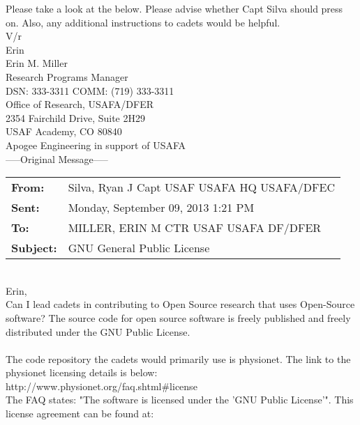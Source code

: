 \documentclass{article}
\begin{document}
Please take a look at the below. Please advise whether Capt Silva should press on. Also, any additional instructions to cadets would be helpful. \\

V/r \\

Erin \\

\noindent Erin M. Miller \\
Research Programs Manager \\
DSN: 333-3311 COMM: (719) 333-3311 \\
Office of Research, USAFA/DFER \\
2354 Fairchild Drive, Suite 2H29 \\
USAF Academy, CO 80840 \\
Apogee Engineering in support of USAFA \\
\newpage
\noindent-----Original Message----- \\

\noindent \begin{tabu} to \textwidth{l X[l]}
 
  \textbf{From:} & Silva, Ryan J Capt USAF USAFA HQ USAFA/DFEC  \\
  \textbf{Sent:} & Monday, September 09, 2013 1:21 PM \\
  \textbf{To:} & MILLER, ERIN M CTR USAF USAFA DF/DFER \\
  \textbf{Subject:} & GNU General Public License \\
\end{tabu}
\hspace{0pt} \\

Erin, \\

Can I lead cadets in contributing to Open Source research that uses Open-Source software? The source code for open source software is freely published and freely distributed under the GNU Public License. \\
 \\
The code repository the cadets would primarily use is physionet. The link to the physionet licensing details is below: \\

http://www.physionet.org/faq.shtml\#license \\

\noindent The FAQ states: "The software is licensed under the 'GNU Public License'". This license agreement can be found at: \\
\end{document}

